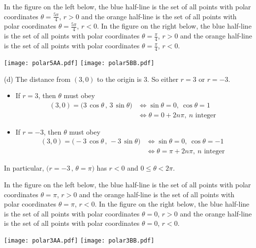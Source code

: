 \begin{solution}
In the figure on the left below, the blue half-line is the set of all points 
with polar coordinates $\theta=\frac{5\pi}{4}$, $r>0$ and the orange half-line 
is the set of all points  with polar coordinates 
$\theta=\frac{5\pi}{4}$, $r<0$. 
In the figure on the right below, the blue half-line is the set of all points 
with polar coordinates $\theta=\frac{\pi}{4}$, $r>0$ and the orange 
half-line is the set of all points  with polar coordinates 
$\theta=\frac{\pi}{4}$, $r<0$. 
\begin{center}
  \texttt{[image: polar5AA.pdf]}\qquad
  \texttt{[image: polar5BB.pdf]}
\end{center}

(d)
The distance from $(3,0)$ to the origin is $3$. 
So either $r=3$ or $r=-3$.
\begin{itemize}
\item If $r=3$, then $\theta$ must obey 
\begin{align*}
(3,0) = \big(3\,\cos\theta\,,\,3\,\sin\theta\big)
&\iff \sin\theta=0,\ \cos\theta=1 \\
&\iff \theta= 0 + 2n\pi,\ n\text{ integer }
\end{align*}
\item If $r=-3$, then $\theta$ must obey 
\begin{align*}
(3,0) = \big(-3\,\cos\theta\,,\,-3\,\sin\theta\big)
&\iff \sin\theta=0,\ \cos\theta=-1 \\
&\iff \theta= \pi + 2n\pi,\ n\text{ integer }
\end{align*}
\end{itemize}
In particular,  $\big(r=-3\,,\,
    \theta= \pi\big)$ has $r<0$
    and $0\le\theta<2\pi$.

In the figure on the left below, the blue half-line is the set of all points 
with polar coordinates $\theta=\pi$, $r>0$ and the orange half-line is the set 
of all points  with polar coordinates $\theta=\pi$, $r<0$. 
In the figure on the right below, the blue half-line is the set of all points 
with polar coordinates $\theta=0$, $r>0$ and the orange half-line is the set 
of all points  with polar coordinates $\theta=0$, $r<0$. 
\begin{center}
  \texttt{[image: polar3AA.pdf]}\qquad
  \texttt{[image: polar3BB.pdf]}
\end{center}


\end{solution}
